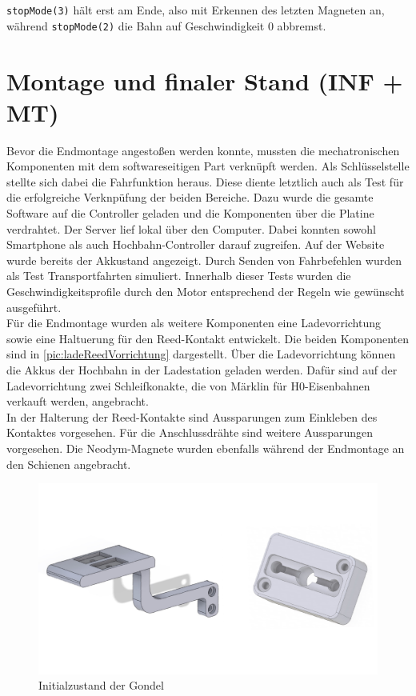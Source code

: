 \texttt{stopMode(3)} hält erst am Ende, also mit Erkennen des letzten Magneten an, während \texttt{stopMode(2)} die Bahn auf Geschwindigkeit 0 abbremst.

\chapter{Montage und finaler Stand (INF + MT)}
Bevor die Endmontage angestoßen werden konnte, mussten die mechatronischen Komponenten mit dem softwareseitigen Part verknüpft werden. Als Schlüsselstelle stellte sich dabei die Fahrfunktion heraus. Diese diente letztlich auch als Test für die erfolgreiche Verknpüfung der beiden Bereiche. Dazu wurde die gesamte Software auf die Controller geladen und die Komponenten über die Platine verdrahtet. Der Server lief lokal über den Computer. Dabei konnten sowohl Smartphone als auch Hochbahn-Controller darauf zugreifen. Auf der Website wurde bereits der Akkustand angezeigt. Durch Senden von Fahrbefehlen wurden als Test Transportfahrten simuliert. Innerhalb dieser Tests wurden die Geschwindigkeitsprofile durch den Motor entsprechend der Regeln wie gewünscht ausgeführt. \\

Für die Endmontage wurden als weitere Komponenten eine Ladevorrichtung sowie eine Haltuerung für den Reed-Kontakt entwickelt. Die beiden Komponenten sind in \autoref{pic:ladeReedVorrichtung} dargestellt. Über die Ladevorrichtung können die Akkus der Hochbahn in der Ladestation geladen werden. Dafür sind auf der Ladevorrichtung zwei Schleifkonakte, die von Märklin für H0-Eisenbahnen verkauft werden, angebracht. \\ 
In der Halterung der Reed-Kontakte sind Aussparungen zum Einkleben des Kontaktes vorgesehen. Für die Anschlussdrähte sind weitere Aussparungen vorgesehen. Die Neodym-Magnete wurden ebenfalls während der Endmontage an den Schienen angebracht.\\

\begin{figure}[h]
	\begin{center}
		\includegraphics[width=14cm]{ladevorrichtungReedHalter.pdf}
		\caption{Initialzustand der Gondel}
		\label{pic:ladeReedVorrichtung}
	\end{center}
\end{figure}
\newpage



